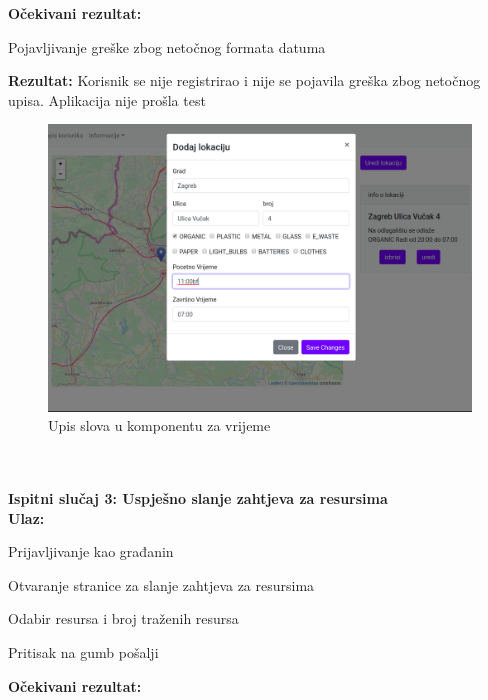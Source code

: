 			\textbf{Očekivani rezultat:}
			
			\begin{packed_enum}
				\item{Pojavljivanje greške zbog netočnog formata datuma}
			\end{packed_enum}
			
			\textbf{Rezultat:} Korisnik se nije registrirao i nije se pojavila greška zbog netočnog upisa. Aplikacija nije prošla test
			
			\begin{figure}[H]
				\includegraphics[scale=0.3]{slike/Netocan_upis.png}
				\centering
				\caption{Upis slova u komponentu za vrijeme}
				\label{fig:Netocan_upis}
			\end{figure}
		
			\text{}\\\\
		
			\textbf{Ispitni slučaj 3: Uspješno slanje zahtjeva za resursima}
			\text{}\\
			
			\textbf{Ulaz:}
			
			\begin{packed_enum}
				\item{Prijavljivanje kao građanin}
				\item{Otvaranje stranice za slanje zahtjeva za resursima}
				\item{Odabir resursa i broj traženih resursa}
				\item{Pritisak na gumb pošalji}
			\end{packed_enum}
			
			\textbf{Očekivani rezultat:}
			
